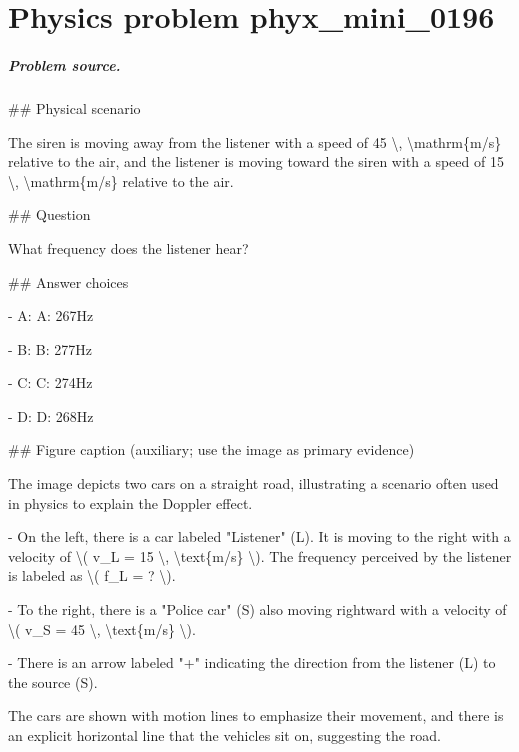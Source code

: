 
\chapter{Physics problem phyx\_mini\_0196}
\label{ch:PhyXMiniProblems_problem_phyx_mini_0196}

\paragraph{Problem source.}
\#\# Physical scenario

The siren is moving away from the listener with a speed of 45 \textbackslash{}, \textbackslash{}mathrm\{m/s\} relative to the air, and the listener is moving toward the siren with a speed of 15 \textbackslash{}, \textbackslash{}mathrm\{m/s\} relative to the air.

\#\# Question

What frequency does the listener hear?

\#\# Answer choices

- A: A: 267Hz

- B: B: 277Hz

- C: C: 274Hz

- D: D: 268Hz

\#\# Figure caption (auxiliary; use the image as primary evidence)

The image depicts two cars on a straight road, illustrating a scenario often used in physics to explain the Doppler effect.

- On the left, there is a car labeled "Listener" (L). It is moving to the right with a velocity of \textbackslash{}( v\_L = 15 \textbackslash{}, \textbackslash{}text\{m/s\} \textbackslash{}). The frequency perceived by the listener is labeled as \textbackslash{}( f\_L = ? \textbackslash{}).

- To the right, there is a "Police car" (S) also moving rightward with a velocity of \textbackslash{}( v\_S = 45 \textbackslash{}, \textbackslash{}text\{m/s\} \textbackslash{}). 

- There is an arrow labeled "+" indicating the direction from the listener (L) to the source (S).

The cars are shown with motion lines to emphasize their movement, and there is an explicit horizontal line that the vehicles sit on, suggesting the road.

